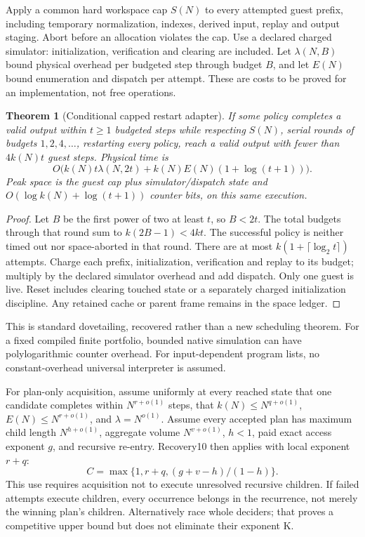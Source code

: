 \documentclass[11pt]{article}
\newtheorem{theorem}{Theorem}
\begin{document}
Apply a common hard workspace cap $S(N)$ to every attempted guest prefix,
including temporary normalization, indexes, derived input, replay and output
staging. Abort before an allocation violates the cap. Use a declared charged
simulator: initialization, verification and clearing are included.
Let $\lambda(N,B)$ bound physical overhead per budgeted step through budget
$B$, and let $E(N)$ bound enumeration and dispatch per attempt. These are
costs to be proved for an implementation, not free operations.

\begin{theorem}[Conditional capped restart adapter]
If some policy completes a valid output within $t\ge1$ budgeted steps while
respecting $S(N)$, serial rounds of budgets $1,2,4,\ldots$, restarting every
policy, reach a valid output with fewer than $4k(N)t$ guest steps.
Physical time is
\[
 O\big(k(N)t\lambda(N,2t)+k(N)E(N)(1+\log(t+1))\big).
\]
Peak space is the guest cap plus simulator/dispatch state and
$O(\log k(N)+\log(t+1))$ counter bits, on this same execution.
\end{theorem}
\begin{proof}
Let $B$ be the first power of two at least $t$, so $B<2t$.
The total budgets through that round sum to $k(2B-1)<4kt$.
The successful policy is neither timed out nor space-aborted in that round.
There are at most $k(1+\lceil\log_2t\rceil)$ attempts. Charge each prefix,
initialization, verification and replay to its budget; multiply by the
declared simulator overhead and add dispatch. Only one guest is live.
Reset includes clearing touched state or a separately charged initialization
discipline. Any retained cache or parent frame remains in the space ledger.
\end{proof}

This is standard dovetailing, recovered rather than a new scheduling theorem.
For a fixed compiled finite portfolio, bounded native simulation can have
polylogarithmic counter overhead. For input-dependent program lists, no
constant-overhead universal interpreter is assumed.

For plan-only acquisition, assume uniformly at every reached state that one
candidate completes within $N^{r+o(1)}$ steps, that $k(N)\le N^{q+o(1)}$,
$E(N)\le N^{r+o(1)}$, and $\lambda=N^{o(1)}$.
Assume every accepted plan has maximum child length $N^{h+o(1)}$,
aggregate volume $N^{v+o(1)}$, $h<1$, paid exact access exponent $g$,
and recursive re-entry. Recovery10 then applies with local exponent $r+q$:
\[
 C=\max\{1,r+q,(g+v-h)/(1-h)\}.
\]
This use requires acquisition not to execute unresolved recursive children.
If failed attempts execute children, every occurrence belongs in the recurrence,
not merely the winning plan's children. Alternatively race whole deciders;
that proves a competitive upper bound but does not eliminate their exponent K.
\end{document}

